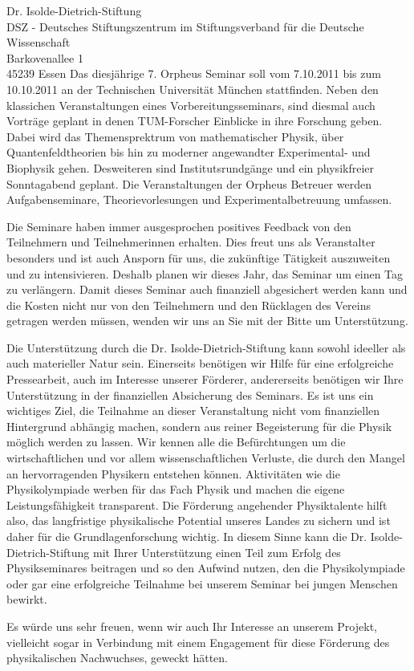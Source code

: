 \documentclass[../style/orpheus,fontsize=11pt]{scrlttr2}
\begin{document}
\begin{letter}{
\noindent Dr. Isolde-Dietrich-Stiftung \\
DSZ - Deutsches Stiftungszentrum im Stiftungsverband f\"ur die Deutsche Wissenschaft \\
Barkovenallee 1\\
45239 Essen
}
Das diesj\"ahrige 7. Orpheus Seminar soll vom 7.10.2011 bis zum 10.10.2011 an der Technischen Universit\"at M\"unchen stattfinden. Neben den klassichen Veranstaltungen eines Vorbereitungsseminars, sind diesmal auch Vortr\"age geplant in denen TUM-Forscher Einblicke in ihre Forschung geben. Dabei wird das Themensprektrum von mathematischer Physik, \"uber Quantenfeldtheorien bis hin zu moderner angewandter Experimental- und Biophysik gehen.  Desweiteren sind Institutsrundg\"ange und ein physikfreier Sonntagabend geplant.  Die Veranstaltungen der Orpheus Betreuer werden Aufgabenseminare, Theorievorlesungen und Experimentalbetreuung umfassen.  

Die Seminare haben immer ausgesprochen positives Feedback von den Teilnehmern und Teilnehmerinnen erhalten.  Dies freut uns als Veranstalter besonders und ist auch Ansporn f\"ur uns, die zuk\"unftige T\"atigkeit auszuweiten und zu intensivieren.  Deshalb planen wir dieses Jahr, das Seminar um einen Tag zu verl\"angern.  Damit dieses Seminar auch finanziell abgesichert werden kann und die Kosten nicht nur von den Teilnehmern und den R\"ucklagen des Vereins getragen werden m\"ussen, wenden wir uns an Sie mit der Bitte um Unterst\"utzung.

Die Unterst\"utzung durch die Dr. Isolde-Dietrich-Stiftung kann sowohl ideeller als auch materieller Natur sein.  Einerseits ben\"otigen wir Hilfe f\"ur eine erfolgreiche Pressearbeit, auch im Interesse unserer F\"orderer,  andererseits ben\"otigen wir Ihre Unterst\"utzung in der finanziellen Absicherung des Seminars. Es ist uns ein wichtiges Ziel, die Teilnahme an dieser Veranstaltung nicht vom finanziellen Hintergrund abh\"angig machen, sondern aus reiner Begeisterung f\"ur die Physik m\"oglich werden zu lassen.  Wir kennen alle die Bef\"urchtungen um die wirtschaftlichen und vor allem wissenschaftlichen Verluste, die durch den Mangel an hervorragenden Physikern entstehen k\"onnen.  Aktivit\"aten wie die Physikolympiade werben f\"ur das Fach Physik und machen die eigene Leistungsf\"ahigkeit transparent. Die F\"orderung angehender Physiktalente hilft also, das langfristige physikalische Potential unseres Landes zu sichern und ist daher für die Grundlagenforschung wichtig.  In diesem Sinne kann die Dr. Isolde-Dietrich-Stiftung mit Ihrer Unterst\"utzung einen Teil zum Erfolg des Physikseminares beitragen und so den Aufwind nutzen, den die Physikolympiade oder gar eine erfolgreiche Teilnahme bei unserem Seminar bei jungen Menschen bewirkt.

Es w\"urde uns sehr freuen, wenn wir auch Ihr Interesse an unserem Projekt, vielleicht sogar in Verbindung mit einem Engagement f\"ur diese F\"orderung des physikalischen Nachwuchses, geweckt h\"atten.


\end{letter}
\end{document}
